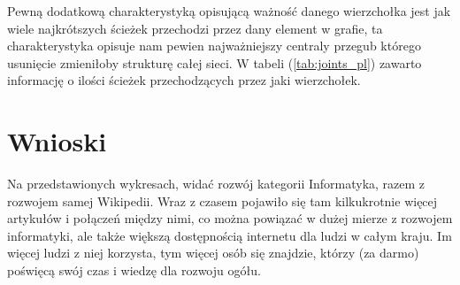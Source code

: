 \documentclass[a4paper, 12pt]{article}
\begin{document}
Pewną dodatkową charakterystyką opisującą ważność danego wierzchołka jest jak wiele najkrótszych ścieżek przechodzi przez dany element w grafie, ta charakterystyka opisuje nam pewien najważniejszy centraly przegub którego usunięcie zmieniłoby strukturę całej sieci. W tabeli (\ref{tab:joints_pl}) zawarto informację o ilości ścieżek przechodzących przez jaki wierzchołek.

\newpage

\begin{center}
    
    \label{tab:joints_pl}
\end{center}

\section{Wnioski}
Na przedstawionych wykresach, widać rozwój kategorii Informatyka, razem z rozwojem samej Wikipedii. Wraz z czasem pojawiło się tam kilkukrotnie więcej artykułów i połączeń między nimi, co można powiązać w dużej mierze z rozwojem informatyki, ale także większą dostępnością internetu dla ludzi w całym kraju. Im więcej ludzi z niej korzysta, tym więcej osób się znajdzie, którzy (za darmo) poświęcą swój czas i wiedzę dla rozwoju ogółu.
\end{document}
